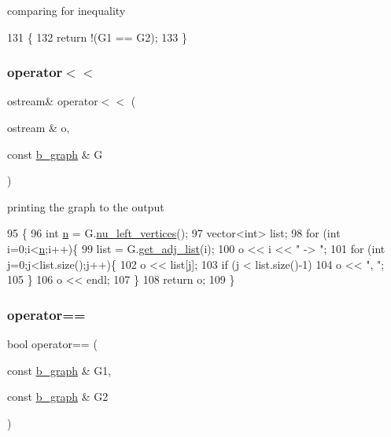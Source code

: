 comparing for inequality 


\begin{DoxyCode}
131 \{
132   \textcolor{keywordflow}{return} !(G1 == G2);
133 \}
\end{DoxyCode}
\mbox{\label{classb__graph_a0635d59bf5b2d1df3d3dd2beef14ac6e}} 
\subsubsection{\texorpdfstring{operator$<$$<$}{operator<<}}
{\footnotesize\ttfamily ostream\& operator$<$$<$ (\begin{DoxyParamCaption}\item[{ostream \&}]{o,  }\item[{const \hyperlink{classb__graph}{b\+\_\+graph} \&}]{G }\end{DoxyParamCaption})\hspace{0.3cm}{\ttfamily [friend]}}



printing the graph to the output 


\begin{DoxyCode}
95 \{
96   \textcolor{keywordtype}{int} \hyperlink{classb__graph_a9e211d40c1799bc9b125de472ff06642}{n} = G.\hyperlink{classb__graph_a5e71d5c97f2501b0b93c17146cf7e68e}{nu\_left\_vertices}();
97   vector<int> list;
98   \textcolor{keywordflow}{for} (\textcolor{keywordtype}{int} i=0;i<\hyperlink{classb__graph_a9e211d40c1799bc9b125de472ff06642}{n};i++)\{
99     list = G.\hyperlink{classb__graph_aa81c7179b9c6cb4986c4b41e84a85799}{get\_adj\_list}(i);
100     o << i << \textcolor{stringliteral}{" -> "};
101     \textcolor{keywordflow}{for} (\textcolor{keywordtype}{int} j=0;j<list.size();j++)\{
102       o << list[j];
103       \textcolor{keywordflow}{if} (j < list.size()-1)
104         o << \textcolor{stringliteral}{", "};
105     \}
106     o << endl;
107   \}
108   \textcolor{keywordflow}{return} o;
109 \}
\end{DoxyCode}
\mbox{\label{classb__graph_adf87735e8372a81049b347b1fdd23484}} 
\subsubsection{\texorpdfstring{operator==}{operator==}}
{\footnotesize\ttfamily bool operator== (\begin{DoxyParamCaption}\item[{const \hyperlink{classb__graph}{b\+\_\+graph} \&}]{G1,  }\item[{const \hyperlink{classb__graph}{b\+\_\+graph} \&}]{G2 }\end{DoxyParamCaption})\hspace{0.3cm}{\ttfamily [friend]}}



